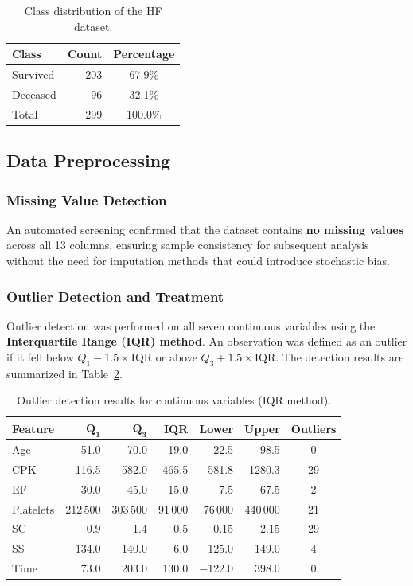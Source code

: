 \documentclass[12pt,a4paper]{article}
\begin{document}
\begin{table}[H]
\centering
\caption{Class distribution of the HF dataset.}
\label{tab:class_distribution}
\begin{tabular}{lrc}
\toprule
\textbf{Class} & \textbf{Count} & \textbf{Percentage} \\
\midrule
Survived & 203 & 67.9\% \\
Deceased & 96  & 32.1\% \\
\midrule
Total    & 299 & 100.0\% \\
\bottomrule
\end{tabular}
\end{table}

\subsection{Data Preprocessing}

\subsubsection{Missing Value Detection}

An automated screening confirmed that the dataset contains \textbf{no missing values} across all 13 columns, ensuring sample consistency for subsequent analysis without the need for imputation methods that could introduce stochastic bias.

\subsubsection{Outlier Detection and Treatment}

Outlier detection was performed on all seven continuous variables using the \textbf{Interquartile Range (IQR) method}. An observation was defined as an outlier if it fell below $Q_1 - 1.5 \times \mathrm{IQR}$ or above $Q_3 + 1.5 \times \mathrm{IQR}$. The detection results are summarized in Table~\ref{tab:outlier_detection}.

\begin{table}[H]
\centering
\caption{Outlier detection results for continuous variables (IQR method).}
\label{tab:outlier_detection}
\small
\begin{tabular}{lrrrrrc}
\toprule
\textbf{Feature} & $\mathbf{Q_1}$ & $\mathbf{Q_3}$ & \textbf{IQR} & \textbf{Lower} & \textbf{Upper} & \textbf{Outliers} \\
\midrule
Age    & 51.0  & 70.0  & 19.0  & 22.5   & 98.5   & 0  \\
CPK    & 116.5 & 582.0 & 465.5 & $-$581.8 & 1280.3 & 29 \\
EF     & 30.0  & 45.0  & 15.0  & 7.5    & 67.5   & 2  \\
Platelets & 212\,500 & 303\,500 & 91\,000 & 76\,000 & 440\,000 & 21 \\
SC     & 0.9   & 1.4   & 0.5   & 0.15   & 2.15   & 29 \\
SS     & 134.0 & 140.0 & 6.0   & 125.0  & 149.0  & 4  \\
Time   & 73.0  & 203.0 & 130.0 & $-$122.0 & 398.0  & 0  \\
\bottomrule
\end{tabular}
\end{table}
\end{document}
